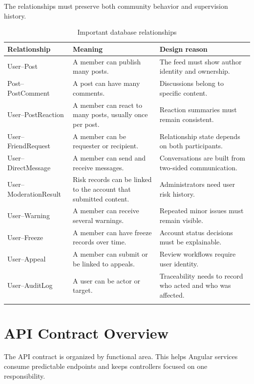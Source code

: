 The relationships must preserve both community behavior and supervision history.

\begin{longtable}{|m{3.5cm}|m{5cm}|m{5.4cm}|}
\hline
\textbf{Relationship} & \textbf{Meaning} & \textbf{Design reason} \\
\hline
User--Post & A member can publish many posts. & The feed must show author identity and ownership. \\
\hline
Post--PostComment & A post can have many comments. & Discussions belong to specific content. \\
\hline
User--PostReaction & A member can react to many posts, usually once per post. & Reaction summaries must remain consistent. \\
\hline
User--FriendRequest & A member can be requester or recipient. & Relationship state depends on both participants. \\
\hline
User--DirectMessage & A member can send and receive messages. & Conversations are built from two-sided communication. \\
\hline
User--ModerationResult & Risk records can be linked to the account that submitted content. & Administrators need user risk history. \\
\hline
User--Warning & A member can receive several warnings. & Repeated minor issues must remain visible. \\
\hline
User--Freeze & A member can have freeze records over time. & Account status decisions must be explainable. \\
\hline
User--Appeal & A member can submit or be linked to appeals. & Review workflows require user identity. \\
\hline
User--AuditLog & A user can be actor or target. & Traceability needs to record who acted and who was affected. \\
\hline
\caption{Important database relationships}
\end{longtable}

\section{API Contract Overview}

The API contract is organized by functional area. This helps Angular services consume predictable endpoints and keeps controllers focused on one responsibility.

